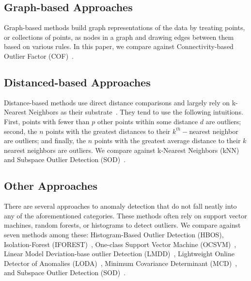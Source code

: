 \subsection{Graph-based Approaches}
\label{subsec:introduction:graph-based-approaches}

Graph-based methods build graph representations of the data by treating points, or collections of points, as nodes in a graph and drawing edges between them based on various rules.
In this paper, we compare against Connectivity-based Outlier Factor (COF)~\cite{tang2002cof}.


\subsection{Distanced-based Approaches}
\label{subsec:related-works:distanced-based-approaches}

Distance-based methods use direct distance comparisons and largely rely on k-Nearest Neighbors as their substrate~\cite{wang2019progress}.
They tend to use the following intuitions.
First, points with fewer than $p$ other points within some distance $d$ are outliers;
second, the $n$ points with the greatest distances to their $k^{th}-$nearest neighbor are outliers;
and finally, the $n$ points with the greatest average distance to their $k$ nearest neighbors are outliers.
We compare against
k-Nearest Neighbors (kNN)~\cite{ramaswamy2000efficient, sridhar2000knn, fabrizio2002knn} and
Subspace Outlier Detection (SOD)~\cite{kriegel2009sod}.


\subsection{Other Approaches}
\label{subsec:introduction:other-appraoches}

There are several approaches to anomaly detection that do not fall neatly into any of the aforementioned categories.
These methods often rely on support vector machines, random forests, or histograms to detect outliers.
We compare against seven methods among these:
Histogram-Based Outlier Detection (HBOS)\cite{goldstein2012histogram},
Isolation-Forest (IFOREST)~\cite{tony2008iforest,tony2012iforest},
One-class Support Vector Machine (OCSVM)~\cite{sholkopf2001ocsvm},
Linear Model Deviation-base outlier Detection (LMDD)~\cite{arning1996linear},
Lightweight Online Detector of Anomalies (LODA)~\cite{pevny2016loda},
Minimum Covariance Determinant (MCD)~\cite{rousseeuw1999mcd,hardin2004mcd}, and
Subspace Outlier Detection (SOD)~\cite{kriegel2009sod}.


